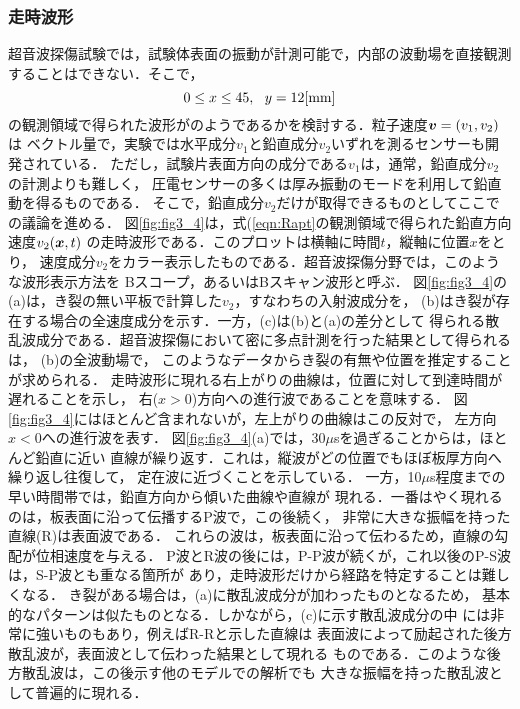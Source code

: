 \subsubsection{走時波形}
超音波探傷試験では，試験体表面の振動が計測可能で，内部の波動場を直接観測
することはできない．そこで，
\begin{equation}
	0\leq x \leq 45 , \ \ y=12[{\rm mm}]
	\label{eqn:Rapt}
\end{equation}
の観測領域で得られた波形がのようであるかを検討する．粒子速度$\mbox{\boldmath $v$}=(v_1, v_2)$は
ベクトル量で，実験では水平成分$v_1$と鉛直成分$v_2$いずれを測るセンサーも開発されている．
ただし，試験片表面方向の成分である$v_1$は，通常，鉛直成分$v_2$の計測よりも難しく，
圧電センサーの多くは厚み振動のモードを利用して鉛直動を得るものである．
そこで，鉛直成分$v_2$だけが取得できるものとしてここでの議論を進める．
図\ref{fig:fig3_4}は，式(\ref{eqn:Rapt}の観測領域で得られた鉛直方向速度$v_2(\mbox{\boldmath $x$},t)$
の走時波形である．このプロットは横軸に時間$t$，縦軸に位置$x$をとり，
速度成分$v_2$をカラー表示したものである．超音波探傷分野では，このような波形表示方法を
Bスコープ，あるいはBスキャン波形と呼ぶ．
図\ref{fig:fig3_4}の(a)は，き裂の無い平板で計算した$v_2$，すなわちの入射波成分を，
(b)はき裂が存在する場合の全速度成分を示す．一方，(c)は(b)と(a)の差分として
得られる散乱波成分である．超音波探傷において密に多点計測を行った結果として得られるは，
(b)の全波動場で， このようなデータからき裂の有無や位置を推定することが求められる．
走時波形に現れる右上がりの曲線は，位置に対して到達時間が遅れることを示し，
右($x>0$)方向への進行波であることを意味する．
図\ref{fig:fig3_4}にはほとんど含まれないが，左上がりの曲線はこの反対で，
左方向$x<0$への進行波を表す．
図\ref{fig:fig3_4}(a)では，30$\mu$sを過ぎることからは，ほとんど鉛直に近い
直線が繰り返す．これは，縦波がどの位置でもほぼ板厚方向へ繰り返し往復して，
定在波に近づくことを示している．
一方，10$\mu$s程度までの早い時間帯では，鉛直方向から傾いた曲線や直線が
現れる．一番はやく現れるのは，板表面に沿って伝播するP波で，この後続く，
非常に大きな振幅を持った直線(R)は表面波である．
これらの波は，板表面に沿って伝わるため，直線の勾配が位相速度を与える．
P波とR波の後には，P-P波が続くが，これ以後のP-S波は，S-P波とも重なる箇所が
あり，走時波形だけから経路を特定することは難しくなる．
き裂がある場合は，(a)に散乱波成分が加わったものとなるため，
基本的なパターンは似たものとなる．しかながら，(c)に示す散乱波成分の中
には非常に強いものもあり，例えばR-Rと示した直線は
表面波によって励起された後方散乱波が，表面波として伝わった結果として現れる
ものである．このような後方散乱波は，この後示す他のモデルでの解析でも
大きな振幅を持った散乱波として普遍的に現れる．
